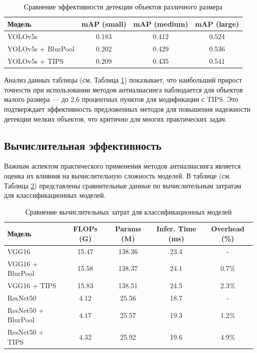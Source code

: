 \begin{table}[h]
\centering
\begin{tabular}{|l|c|c|c|}
\hline
\textbf{Модель} & \textbf{mAP (small)} & \textbf{mAP (medium)} & \textbf{mAP (large)} \\
\hline
YOLOv5s & 0.183 & 0.412 & 0.524 \\
YOLOv5s + BlurPool & 0.202 & 0.429 & 0.536 \\
YOLOv5s + TIPS & 0.209 & 0.435 & 0.541 \\
\hline
\end{tabular}
\caption{Сравнение эффективности детекции объектов различного размера}
\label{tab:detection_size_results}
\end{table}

Анализ данных таблицы (см. Таблица \ref{tab:detection_size_results}) показывает, что наибольший прирост точности при использовании методов антиалиасинга наблюдается для объектов малого размера — до 2.6 процентных пунктов для модификации с TIPS. Это подтверждает эффективность предложенных методов для повышения надежности детекции мелких объектов, что критично для многих практических задач.

\subsection{Вычислительная эффективность}
\label{ssec:computational_efficiency}

Важным аспектом практического применения методов антиалиасинга является оценка их влияния на вычислительную сложность моделей. В таблице (см. Таблица \ref{tab:computational_efficiency_classification}) представлены сравнительные данные по вычислительным затратам для классификационных моделей.

\begin{table}[h]
\centering
\begin{tabular}{|l|c|c|c|c|}
\hline
\textbf{Модель} & \textbf{FLOPs (G)} & \textbf{Params (M)} & \textbf{Infer. Time (ms)} & \textbf{Overhead (\%)} \\
\hline
VGG16 & 15.47 & 138.36 & 23.4 & - \\
VGG16 + BlurPool & 15.58 & 138.37 & 24.1 & 0.7\% \\
VGG16 + TIPS & 15.83 & 138.51 & 24.5 & 2.3\% \\
\hline
ResNet50 & 4.12 & 25.56 & 18.7 & - \\
ResNet50 + BlurPool & 4.17 & 25.57 & 19.3 & 1.2\% \\
ResNet50 + TIPS & 4.32 & 25.92 & 19.6 & 4.9\% \\
\hline
\end{tabular}
\caption{Сравнение вычислительных затрат для классификационных моделей}
\label{tab:computational_efficiency_classification}
\end{table}


